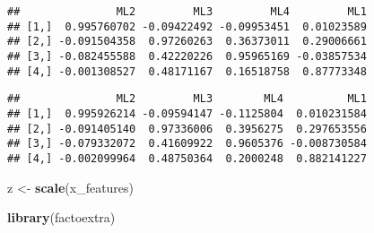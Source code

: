 \documentclass[
]{article}
\newenvironment{Shaded}{\begin{snugshade}}{\end{snugshade}}
\newcommand{\DecValTok}[1]{\textcolor[rgb]{0.00,0.00,0.81}{#1}}
\newcommand{\KeywordTok}[1]{\textcolor[rgb]{0.13,0.29,0.53}{\textbf{#1}}}
\newcommand{\NormalTok}[1]{#1}
\newcommand{\OperatorTok}[1]{\textcolor[rgb]{0.81,0.36,0.00}{\textbf{#1}}}
\newcommand{\StringTok}[1]{\textcolor[rgb]{0.31,0.60,0.02}{#1}}
\begin{document}
\begin{verbatim}
##               ML2         ML3         ML4         ML1
## [1,]  0.995760702 -0.09422492 -0.09953451  0.01023589
## [2,] -0.091504358  0.97260263  0.36373011  0.29006661
## [3,] -0.082455588  0.42220226  0.95965169 -0.03857534
## [4,] -0.001308527  0.48171167  0.16518758  0.87773348
\end{verbatim}

\begin{Shaded}
\end{Shaded}

\begin{verbatim}
##               ML2         ML3        ML4          ML1
## [1,]  0.995926214 -0.09594147 -0.1125804  0.010231584
## [2,] -0.091405140  0.97336006  0.3956275  0.297653556
## [3,] -0.079332072  0.41609922  0.9605376 -0.008730584
## [4,] -0.002099964  0.48750364  0.2000248  0.882141227
\end{verbatim}

\begin{Shaded}
\end{Shaded}

\begin{Shaded}
\begin{Highlighting}[]
\NormalTok{z <-}\StringTok{ }\KeywordTok{scale}\NormalTok{(x_features)}

\KeywordTok{library}\NormalTok{(factoextra)}
\end{Highlighting}
\end{Shaded}
\end{document}

